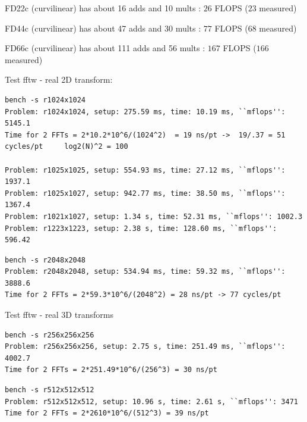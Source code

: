 \mni
FD22c (curvilinear) has about 16 adds and 10 mults : $26$ FLOPS ($23$ measured)

\mni
FD44c (curvilinear) has about 47 adds and 30 mults : $77$ FLOPS ($68$ measured)

\mni
FD66c (curvilinear) has about 111 adds and 56 mults : $167$ FLOPS ($166$ measured)

\clearpage
\mni
Test fftw - real 2D transform: 
\begin{Verbatim}[fontsize=\small]
bench -s r1024x1024
Problem: r1024x1024, setup: 275.59 ms, time: 10.19 ms, ``mflops'': 5145.1
Time for 2 FFTs = 2*10.2*10^6/(1024^2)  = 19 ns/pt ->  19/.37 = 51 cycles/pt     log2(N)^2 = 100 

Problem: r1025x1025, setup: 554.93 ms, time: 27.12 ms, ``mflops'': 1937.1
Problem: r1025x1027, setup: 942.77 ms, time: 38.50 ms, ``mflops'': 1367.4
Problem: r1021x1027, setup: 1.34 s, time: 52.31 ms, ``mflops'': 1002.3
Problem: r1223x1223, setup: 2.38 s, time: 128.60 ms, ``mflops'': 596.42

\end{Verbatim}
\begin{Verbatim}[fontsize=\small]
bench -s r2048x2048
Problem: r2048x2048, setup: 534.94 ms, time: 59.32 ms, ``mflops'': 3888.6
Time for 2 FFTs = 2*59.3*10^6/(2048^2) = 28 ns/pt -> 77 cycles/pt
\end{Verbatim}

Test fftw - real 3D transforms
\begin{Verbatim}[fontsize=\small]
bench -s r256x256x256
Problem: r256x256x256, setup: 2.75 s, time: 251.49 ms, ``mflops'': 4002.7
Time for 2 FFTs = 2*251.49*10^6/(256^3) = 30 ns/pt
\end{Verbatim}
\begin{Verbatim}[fontsize=\small]
 bench -s r512x512x512
Problem: r512x512x512, setup: 10.96 s, time: 2.61 s, ``mflops'': 3471
Time for 2 FFTs = 2*2610*10^6/(512^3) = 39 ns/pt
\end{Verbatim}
